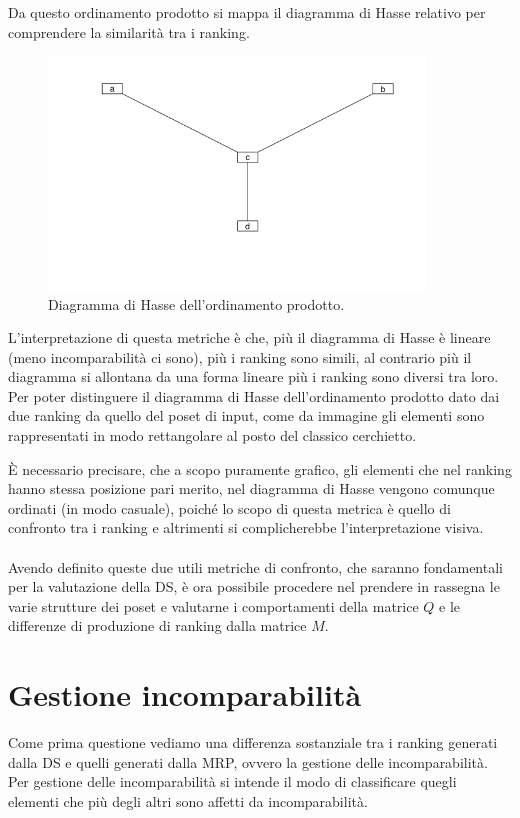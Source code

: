 \documentclass{report}
\begin{document}
Da questo ordinamento prodotto si mappa il diagramma di Hasse relativo per comprendere la similarità tra i ranking.

\begin{figure}[H]
    \centering
    \includegraphics[width=10cm]{IMAGES/poset_15.png}
    \caption{Diagramma di Hasse dell'ordinamento prodotto.}
    \label{fig:roc}
\end{figure}

L'interpretazione di questa metriche è che, più il diagramma di Hasse è lineare (meno incomparabilità ci sono), più i ranking sono simili, al contrario più il diagramma si allontana da una forma lineare più i ranking sono diversi tra loro. Per poter distinguere il diagramma di Hasse dell'ordinamento prodotto dato dai due ranking da quello del poset di input, come da immagine gli elementi sono rappresentati in modo rettangolare al posto del classico cerchietto.


È necessario precisare, che a scopo puramente grafico, gli elementi che nel ranking hanno stessa posizione pari merito, nel diagramma di Hasse vengono comunque ordinati (in modo casuale), poiché lo scopo di questa metrica è quello di confronto tra i ranking e altrimenti si complicherebbe l'interpretazione visiva.
\\~\\
Avendo definito queste due utili metriche di confronto, che saranno fondamentali per la valutazione della DS, è ora possibile procedere nel prendere in rassegna le varie strutture dei poset e valutarne i comportamenti della matrice $Q$ e le differenze di produzione di ranking dalla matrice $M$.

\section{Gestione incomparabilità}
Come prima questione vediamo una differenza sostanziale tra i ranking generati dalla DS e quelli generati dalla MRP, ovvero la gestione delle incomparabilità. Per gestione delle incomparabilità si intende il modo di classificare quegli elementi che più degli altri sono affetti da incomparabilità.
\end{document}
